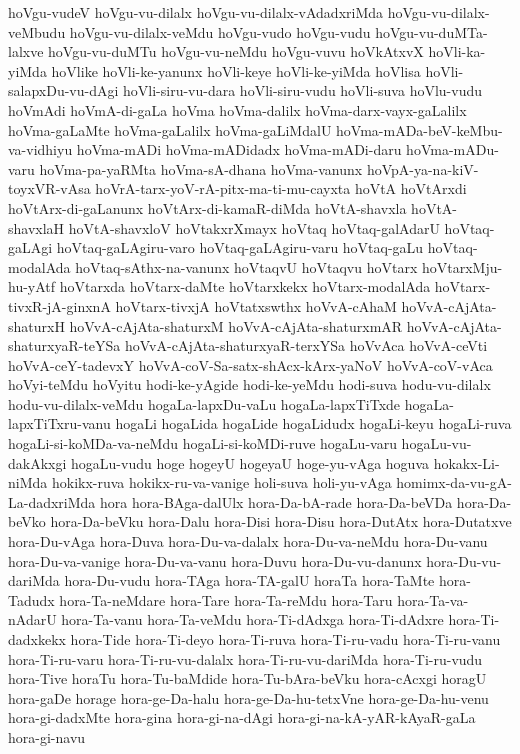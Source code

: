 {hoVgu-vudeV
hoVgu-vu-dilalx
hoVgu-vu-dilalx-vAdadxriMda
hoVgu-vu-dilalx-veMbudu
hoVgu-vu-dilalx-veMdu
hoVgu-vudo
hoVgu-vudu
hoVgu-vu-duMTa-lalxve
hoVgu-vu-duMTu
hoVgu-vu-neMdu
hoVgu-vuvu
hoVkAtxvX
hoVli-ka-yiMda
hoVlike
hoVli-ke-yanunx
hoVli-keye
hoVli-ke-yiMda
hoVlisa
hoVli-salapxDu-vu-dAgi
hoVli-siru-vu-dara
hoVli-siru-vudu
hoVli-suva
hoVlu-vudu
hoVmAdi
hoVmA-di-gaLa
hoVma
hoVma-dalilx
hoVma-darx-vayx-gaLalilx
hoVma-gaLaMte
hoVma-gaLalilx
hoVma-gaLiMdalU
hoVma-mADa-beV-keMbu-va-vidhiyu
hoVma-mADi
hoVma-mADidadx
hoVma-mADi-daru
hoVma-mADu-varu
hoVma-pa-yaRMta
hoVma-sA-dhana
hoVma-vanunx
hoVpA-ya-na-kiV-toyxVR-vAsa
hoVrA-tarx-yoV-rA-pitx-ma-ti-mu-cayxta
hoVtA
hoVtArxdi
hoVtArx-di-gaLanunx
hoVtArx-di-kamaR-diMda
hoVtA-shavxla
hoVtA-shavxlaH
hoVtA-shavxloV
hoVtakxrXmayx
hoVtaq
hoVtaq-galAdarU
hoVtaq-gaLAgi
hoVtaq-gaLAgiru-varo
hoVtaq-gaLAgiru-varu
hoVtaq-gaLu
hoVtaq-modalAda
hoVtaq-sAthx-na-vanunx
hoVtaqvU
hoVtaqvu
hoVtarx
hoVtarxMju-hu-yAtf
hoVtarxda
hoVtarx-daMte
hoVtarxkekx
hoVtarx-modalAda
hoVtarx-tivxR-jA-ginxnA
hoVtarx-tivxjA
hoVtatxswthx
hoVvA-cAhaM
hoVvA-cAjAta-shaturxH
hoVvA-cAjAta-shaturxM
hoVvA-cAjAta-shaturxmAR
hoVvA-cAjAta-shaturxyaR-teYSa
hoVvA-cAjAta-shaturxyaR-terxYSa
hoVvAca
hoVvA-ceVti
hoVvA-ceY-tadevxY
hoVvA-coV-Sa-satx-shAcx-kArx-yaNoV
hoVvA-coV-vAca
hoVyi-teMdu
hoVyitu
hodi-ke-yAgide
hodi-ke-yeMdu
hodi-suva
hodu-vu-dilalx
hodu-vu-dilalx-veMdu
hogaLa-lapxDu-vaLu
hogaLa-lapxTiTxde
hogaLa-lapxTiTxru-vanu
hogaLi
hogaLida
hogaLide
hogaLidudx
hogaLi-keyu
hogaLi-ruva
hogaLi-si-koMDa-va-neMdu
hogaLi-si-koMDi-ruve
hogaLu-varu
hogaLu-vu-dakAkxgi
hogaLu-vudu
hoge
hogeyU
hogeyaU
hoge-yu-vAga
hoguva
hokakx-Li-niMda
hokikx-ruva
hokikx-ru-va-vanige
holi-suva
holi-yu-vAga
homimx-da-vu-gA-La-dadxriMda
hora
hora-BAga-dalUlx
hora-Da-bA-rade
hora-Da-beVDa
hora-Da-beVko
hora-Da-beVku
hora-Dalu
hora-Disi
hora-Disu
hora-DutAtx
hora-Dutatxve
hora-Du-vAga
hora-Duva
hora-Du-va-dalalx
hora-Du-va-neMdu
hora-Du-vanu
hora-Du-va-vanige
hora-Du-va-vanu
hora-Duvu
hora-Du-vu-danunx
hora-Du-vu-dariMda
hora-Du-vudu
hora-TAga
hora-TA-galU
horaTa
hora-TaMte
hora-Tadudx
hora-Ta-neMdare
hora-Tare
hora-Ta-reMdu
hora-Taru
hora-Ta-va-nAdarU
hora-Ta-vanu
hora-Ta-veMdu
hora-Ti-dAdxga
hora-Ti-dAdxre
hora-Ti-dadxkekx
hora-Tide
hora-Ti-deyo
hora-Ti-ruva
hora-Ti-ru-vadu
hora-Ti-ru-vanu
hora-Ti-ru-varu
hora-Ti-ru-vu-dalalx
hora-Ti-ru-vu-dariMda
hora-Ti-ru-vudu
hora-Tive
horaTu
hora-Tu-baMdide
hora-Tu-bAra-beVku
hora-cAcxgi
horagU
hora-gaDe
horage
hora-ge-Da-halu
hora-ge-Da-hu-tetxVne
hora-ge-Da-hu-venu
hora-gi-dadxMte
hora-gina
hora-gi-na-dAgi
hora-gi-na-kA-yAR-kAyaR-gaLa
hora-gi-navu
}
